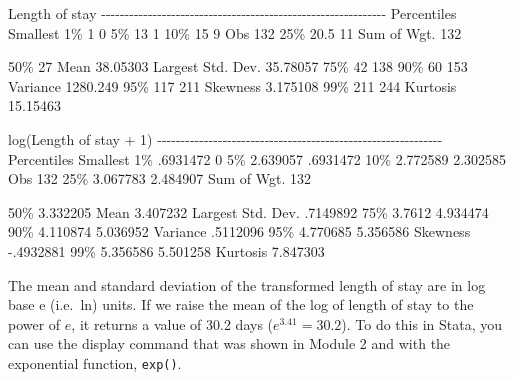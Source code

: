 \documentclass[
]{memoir}
\newenvironment{Shaded}{\begin{snugshade}}{\end{snugshade}}
\newcommand{\NormalTok}[1]{#1}
\begin{document}
\begin{Shaded}
\begin{Highlighting}[]
\NormalTok{                       Length of stay}
\NormalTok{{-}{-}{-}{-}{-}{-}{-}{-}{-}{-}{-}{-}{-}{-}{-}{-}{-}{-}{-}{-}{-}{-}{-}{-}{-}{-}{-}{-}{-}{-}{-}{-}{-}{-}{-}{-}{-}{-}{-}{-}{-}{-}{-}{-}{-}{-}{-}{-}{-}{-}{-}{-}{-}{-}{-}{-}{-}{-}{-}{-}{-}}
\NormalTok{      Percentiles      Smallest}
\NormalTok{ 1\%            1              0}
\NormalTok{ 5\%           13              1}
\NormalTok{10\%           15              9       Obs                 132}
\NormalTok{25\%         20.5             11       Sum of Wgt.         132}

\NormalTok{50\%           27                      Mean           38.05303}
\NormalTok{                        Largest       Std. Dev.      35.78057}
\NormalTok{75\%           42            138}
\NormalTok{90\%           60            153       Variance       1280.249}
\NormalTok{95\%          117            211       Skewness       3.175108}
\NormalTok{99\%          211            244       Kurtosis       15.15463}

\NormalTok{                   log(Length of stay + 1)}
\NormalTok{{-}{-}{-}{-}{-}{-}{-}{-}{-}{-}{-}{-}{-}{-}{-}{-}{-}{-}{-}{-}{-}{-}{-}{-}{-}{-}{-}{-}{-}{-}{-}{-}{-}{-}{-}{-}{-}{-}{-}{-}{-}{-}{-}{-}{-}{-}{-}{-}{-}{-}{-}{-}{-}{-}{-}{-}{-}{-}{-}{-}{-}}
\NormalTok{      Percentiles      Smallest}
\NormalTok{ 1\%     .6931472              0}
\NormalTok{ 5\%     2.639057       .6931472}
\NormalTok{10\%     2.772589       2.302585       Obs                 132}
\NormalTok{25\%     3.067783       2.484907       Sum of Wgt.         132}

\NormalTok{50\%     3.332205                      Mean           3.407232}
\NormalTok{                        Largest       Std. Dev.      .7149892}
\NormalTok{75\%       3.7612       4.934474}
\NormalTok{90\%     4.110874       5.036952       Variance       .5112096}
\NormalTok{95\%     4.770685       5.356586       Skewness      {-}.4932881}
\NormalTok{99\%     5.356586       5.501258       Kurtosis       7.847303}
\end{Highlighting}
\end{Shaded}

The mean and standard deviation of the transformed length of stay are in log base e (i.e.~ln) units. If we raise the mean of the log of length of stay to the power of \(e\), it returns a value of 30.2 days (\(e^{3.41}=30.2\)). To do this in Stata, you can use the display command that was shown in Module 2 and with the exponential function, \texttt{exp()}.
\end{document}
